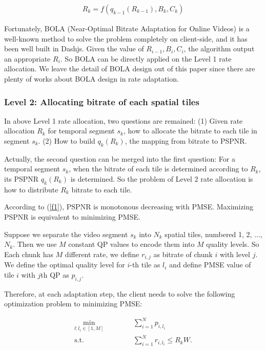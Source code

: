 \begin{equation}
\begin{aligned}
R_k = f(q_{k-1}(R_{k-1}), B_k, C_k)
\end{aligned}
\end{equation}

Fortunately, BOLA (Near-Optimal Bitrate Adaptation for Online Videos) \cite{BOLA} is a well-known method to solve the problem completely on client-side, and it has been well built in Dashjs. Given the value of $R_{i-1}, B_i, C_i$, the algorithm output an appropriate $R_i$. So BOLA can be directly applied on the Level 1 rate allocation. We leave the detail of BOLA design out of this paper since there are plenty of works about BOLA design in rate adaptation.

\subsubsection{Level 2: Allocating bitrate of each spatial tiles}

In above Level 1 rate allocation, two questions are remained: (1) Given rate allocation $R_k$ for temporal segment $s_k$, how to allocate the bitrate to each tile in segment $s_k$. (2) How to build $q_k(R_k)$, the mapping from bitrate to PSPNR. 

Actually, the second question can be merged into the first question: For a temporal segment $s_k$, when the bitrate of each tile is determined according to $R_k$, its PSPNR $q_k(R_k)$ is determined. So the problem of Level 2 rate allocation is how to distribute $R_k$ bitrate to each tile.

According to (\ref{f1}), PSPNR is monotonous decreasing with PMSE. Maximizing PSPNR is equivalent to minimizing PMSE.

Suppose we separate the video segment $s_k$ into $N_k$ spatial tiles, numbered 1, 2, ..., $N_k$. Then we use $M$ constant QP values to encode them into $M$ quality levels. So Each chunk has $M$ different rate, we define $r_{i, j}$ as bitrate of chunk $i$ with level $j$. We define the optimal quality level for $i$-th tile as $l_i$ and define PMSE value of tile $i$ with $j$th QP as $p_{i, j}$.

Therefore, at each adaptation step, the client needs to solve the following optimization problem to minimizing PMSE:

\begin{equation}
\begin{aligned}
\min_{l: l_i \in [1, M]} \text{~~~~~~} & \text{~~~~} \sum_{i = 1}^N p_{i, l_i} \\
\text{s.t.} \text{~~~~} & \text{~~~~}\sum_{i=1}^N r_{i,l_i} \le R_kW.
\end{aligned}
\end{equation}

